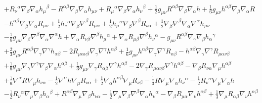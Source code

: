 \documentclass[10pt,letterpaper]{article}
\numberwithin{equation}{section}
\begin{document}
\begin{eqnarray}
&& + R_{\nu }{}^{\alpha } \nabla_{\beta }\nabla_{\alpha }h_{\mu }{}^{\beta } -  R^{\alpha \beta } \nabla_{\beta }\nabla_{\alpha }h_{\mu \nu } + R_{\mu }{}^{\alpha } \nabla_{\beta }\nabla_{\alpha }h_{\nu }{}^{\beta } + \tfrac{1}{2} g_{\mu \nu } R^{\alpha \beta } \nabla_{\beta }\nabla_{\alpha }h + \tfrac{1}{6} g_{\mu \nu } h^{\alpha \beta } \nabla_{\beta }\nabla_{\alpha }R \nonumber \\ 
&& -  h^{\alpha \beta } \nabla_{\beta }\nabla_{\alpha }R_{\mu \nu } + \tfrac{1}{2} h_{\nu }{}^{\alpha } \nabla_{\beta }\nabla^{\beta }R_{\mu \alpha } + \tfrac{1}{2} h_{\mu }{}^{\alpha } \nabla_{\beta }\nabla^{\beta }R_{\nu \alpha } + \tfrac{1}{2} \nabla_{\beta }\nabla^{\beta }\nabla_{\alpha }\nabla^{\alpha }h_{\mu \nu } \nonumber \\ 
&& -  \tfrac{1}{6} g_{\mu \nu } \nabla_{\beta }\nabla^{\beta }\nabla_{\alpha }\nabla^{\alpha }h + \nabla_{\alpha }R_{\nu \beta } \nabla^{\beta }h_{\mu }{}^{\alpha } + \nabla_{\alpha }R_{\mu \beta } \nabla^{\beta }h_{\nu }{}^{\alpha } -  g_{\mu \nu } R^{\alpha \beta } \nabla_{\gamma }\nabla_{\beta }h_{\alpha }{}^{\gamma } \nonumber \\ 
&& + \tfrac{2}{3} g_{\mu \nu } R^{\alpha \beta } \nabla_{\gamma }\nabla^{\gamma }h_{\alpha \beta } - 2 R_{\mu \alpha \nu \beta } \nabla_{\gamma }\nabla^{\gamma }h^{\alpha \beta } + \tfrac{1}{6} g_{\mu \nu } h^{\alpha \beta } \nabla_{\gamma }\nabla^{\gamma }R_{\alpha \beta } -  h^{\alpha \beta } \nabla_{\gamma }\nabla^{\gamma }R_{\mu \alpha \nu \beta } \nonumber \\ 
&& + \tfrac{1}{6} g_{\mu \nu } \nabla_{\gamma }\nabla^{\gamma }\nabla_{\beta }\nabla_{\alpha }h^{\alpha \beta } + \tfrac{1}{3} g_{\mu \nu } \nabla_{\gamma }R_{\alpha \beta } \nabla^{\gamma }h^{\alpha \beta } - 2 \nabla_{\gamma }R_{\mu \alpha \nu \beta } \nabla^{\gamma }h^{\alpha \beta } -  \nabla_{\beta }R_{\nu \alpha } \nabla_{\mu }h^{\alpha \beta } \nonumber \\ 
&& + \tfrac{1}{6} \nabla^{\alpha }R \nabla_{\mu }h_{\nu \alpha } -  \tfrac{1}{2} \nabla^{\alpha }h \nabla_{\mu }R_{\nu \alpha } + \tfrac{1}{2} \nabla_{\alpha }h^{\alpha \beta } \nabla_{\mu }R_{\nu \beta } -  \tfrac{1}{3} R \nabla_{\mu }\nabla_{\alpha }h_{\nu }{}^{\alpha } -  \tfrac{1}{2} R_{\nu }{}^{\alpha } \nabla_{\mu }\nabla_{\alpha }h \nonumber \\ 
&& -  \tfrac{1}{2} R_{\nu }{}^{\alpha } \nabla_{\mu }\nabla_{\beta }h_{\alpha }{}^{\beta } + R^{\alpha \beta } \nabla_{\mu }\nabla_{\beta }h_{\nu \alpha } -  \tfrac{1}{2} \nabla_{\mu }\nabla_{\beta }\nabla^{\beta }\nabla_{\alpha }h_{\nu }{}^{\alpha } -  \nabla_{\beta }R_{\mu \alpha } \nabla_{\nu }h^{\alpha \beta } + \tfrac{1}{3} \nabla_{\mu }R_{\alpha \beta } \nabla_{\nu }h^{\alpha \beta } \nonumber \\ 

\end{eqnarray}
\end{document}
